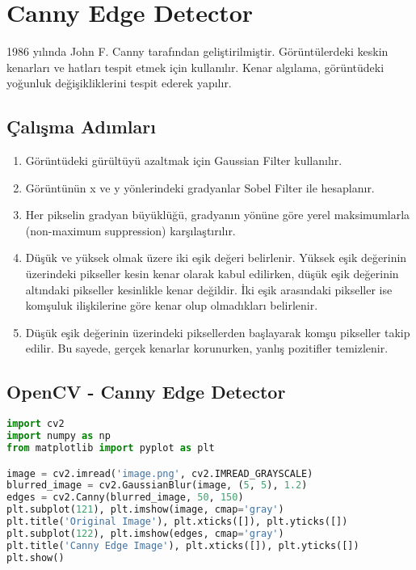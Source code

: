 \section{Canny Edge Detector}
1986 yılında John F. Canny tarafından geliştirilmiştir. Görüntülerdeki keskin kenarları ve hatları tespit etmek için kullanılır. Kenar algılama, görüntüdeki yoğunluk değişikliklerini tespit ederek yapılır. 

\subsection{Çalışma Adımları}
\begin{enumerate}
	\item Görüntüdeki gürültüyü azaltmak için Gaussian Filter kullanılır. 
	\item Görüntünün x ve y yönlerindeki gradyanlar Sobel Filter ile hesaplanır.
	\item Her pikselin gradyan büyüklüğü, gradyanın yönüne göre yerel maksimumlarla (non-maximum suppression) karşılaştırılır.
	\item Düşük ve yüksek olmak üzere iki eşik değeri belirlenir. Yüksek eşik değerinin üzerindeki pikseller kesin kenar olarak kabul edilirken, düşük eşik değerinin altındaki pikseller kesinlikle kenar değildir. İki eşik arasındaki pikseller ise komşuluk ilişkilerine göre kenar olup olmadıkları belirlenir.
	\item Düşük eşik değerinin üzerindeki piksellerden başlayarak komşu pikseller takip edilir. Bu sayede, gerçek kenarlar korunurken, yanlış pozitifler temizlenir.
\end{enumerate}

\subsection{OpenCV - Canny Edge Detector}
\begin{lstlisting}[language=Python]
import cv2
import numpy as np
from matplotlib import pyplot as plt

image = cv2.imread('image.png', cv2.IMREAD_GRAYSCALE)
blurred_image = cv2.GaussianBlur(image, (5, 5), 1.2)
edges = cv2.Canny(blurred_image, 50, 150)
plt.subplot(121), plt.imshow(image, cmap='gray')
plt.title('Original Image'), plt.xticks([]), plt.yticks([])
plt.subplot(122), plt.imshow(edges, cmap='gray')
plt.title('Canny Edge Image'), plt.xticks([]), plt.yticks([])
plt.show()
\end{lstlisting}


\newpage
